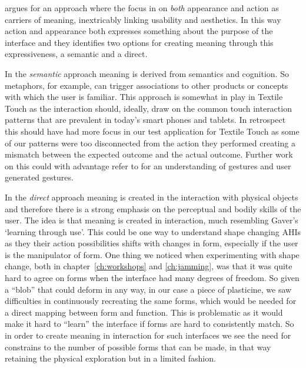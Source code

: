 \citeauthor{djajadiningrat2004tangible} argues for an approach where the focus in on \emph{both} appearance and action as carriers of meaning, inextricably linking usability and aesthetics.
In this way action and appearance both expresses something about the purpose of the interface and they identifies two options for creating meaning through this expressiveness, a semantic and a direct.

In the \emph{semantic} approach meaning is derived from semantics and cognition.
So metaphors, for example, can trigger associations to other products or concepts with which the user is familiar.
This approach is somewhat in play in Textile Touch as the interaction should, ideally, draw on the common touch interaction patterns that are prevalent in today's smart phones and tablets.
In retrospect this should have had more focus in our test application for Textile Touch as some of our patterns were too disconnected from the action they performed creating a mismatch between the expected outcome and the actual outcome.
Further work on this could with advantage refer to \citep{wobbrock2009user,morris2010understanding} for an understanding of gestures and user generated gestures.

In the \emph{direct} approach meaning is created in the interaction with physical objects and therefore there is a strong emphasis on the perceptual and bodily skills of the user.
The idea is that meaning is created in interaction, much resembling Gaver's `learning through use'. 
This could be one way to understand shape changing AHIs as they their action possibilities shifts with changes in form, especially if the user is the manipulator of form.
One thing we noticed when experimenting with shape change, both in chapter~\ref{ch:workshops} and \ref{ch:jamming}, was that it was quite hard to agree on forms when the interface had many degrees of freedom.
So given a ``blob'' that could deform in any way, in our case a piece of plasticine, we saw difficulties in continuously recreating the same forms, which would be needed for a direct mapping between form and function.
This is problematic as it would make it hard to ``learn'' the interface if forms are hard to consistently match.
So in order to create meaning in interaction for such interfaces we see the need for constrains to the number of possible forms that can be made, in that way retaining the physical exploration but in a limited fashion.

